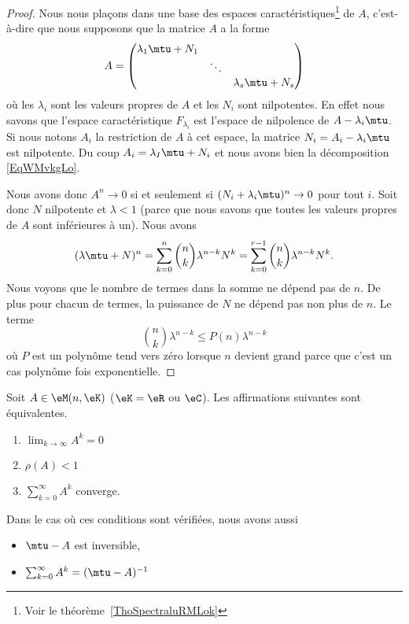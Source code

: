 \begin{proof}
	Nous nous plaçons dans une base des espaces caractéristiques\footnote{Voir le théorème~\ref{ThoSpectraluRMLok}} de \( A\), c'est-à-dire que nous supposons que la matrice \( A\) a la forme
	\begin{equation}        \label{EqWMvkgLo}
		A=\begin{pmatrix}
			\lambda_1\mtu+N_1 &        &                   \\
			                  & \ddots &                   \\
			                  &        & \lambda_s\mtu+N_s
		\end{pmatrix}
	\end{equation}
	où les \( \lambda_i\) sont les valeurs propres de \( A\) et les \( N_i\) sont nilpotentes. En effet nous savons que l'espace caractéristique \( F_{\lambda_i}\) est l'espace de nilpolence de \( A-\lambda_i\mtu\). Si nous notons \( A_i\) la restriction de \( A\) à cet espace, la matrice \( N_i=A_i-\lambda_i\mtu\) est nilpotente. Du coup \( A_i=\lambda_I\mtu+N_i\) et nous avons bien la décomposition \eqref{EqWMvkgLo}.

	Nous avons donc \( A^n\to 0\) si et seulement si \( (N_i+\lambda_i\mtu)^n\to 0\) pour tout \( i\). Soit donc \( N\) nilpotente et \( \lambda<1\) (parce que nous savons que toutes les valeurs propres de \( A\) sont inférieures à un). Nous avons
	\begin{equation}
		(\lambda\mtu+N)^n=\sum_{k=0}^n\binom{ n }{ k }\lambda^{n-k}N^{k}
		=\sum_{k=0}^{r-1}\binom{ n }{ k }\lambda^{n-k}N^{k}.
	\end{equation}
	Nous voyons que le nombre de termes dans la somme ne dépend pas de \( n\). De plus pour chacun de termes, la puissance de \( N\) ne dépend pas non plus de \( n\). Le terme
	\begin{equation}
		\binom{ n }{ k }\lambda^{n-k}\leq P(n)\lambda^{n-k}
	\end{equation}
	où \( P\) est un polynôme tend vers zéro lorsque \( n\) devient grand parce que c'est un cas polynôme fois exponentielle.
\end{proof}

\begin{theorem}   \label{THOooMNLGooKETwhh}
	Soit \( A\in \eM(n,\eK)\) (\( \eK=\eR\) ou \( \eC\)). Les affirmations suivantes sont équivalentes.
	\begin{enumerate}
		\item       \label{ITEMooCGLSooZsMXSt}
		      \( \lim_{k\to \infty} A^k=0\)
		\item       \label{ITEMooYBGEooXAzVbD}
		      \( \rho(A)<1\)
		\item       \label{ITEMooEJSQooTqkBbo}
		      \( \sum_{k=0}^{\infty}A^k\) converge.
	\end{enumerate}
	Dans le cas où ces conditions sont vérifiées, nous avons aussi
	\begin{itemize}
		\item \( \mtu-A\) est inversible,
		\item
		      \(\sum_{k=0}^{\infty}A^k=(\mtu - A)^{-1}\)
	\end{itemize}
\end{theorem}

